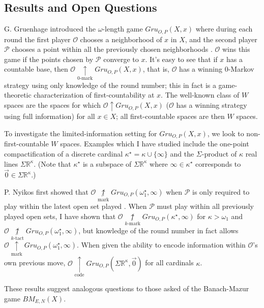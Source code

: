 \documentclass[11pt]{amsart}
\theoremstyle{plain}
\newcommand{\win}{\uparrow}
\newcommand{\markwin}{\underset{\text{mark}}{\uparrow}}
\newcommand{\kmarkwin}[1]{\underset{#1\text{-mark}}{\uparrow}}
\newcommand{\codewin}{\underset{\text{code}}{\uparrow}}
\newcommand{\notmarkwin}{\underset{\text{mark}}{\not\uparrow}}
\newcommand{\notkmarkwin}[1]{\underset{#1\text{-mark}}{\not\uparrow}}
\newcommand{\notktactwin}[1]{\underset{#1\text{-tact}}{\not\uparrow}}
\newcommand{\oneptcomp}[1]{#1^\star}
\newcommand{\gruConGame}[2]{Gru_{O,P}(#1,#2)}
\newcommand{\<}{\langle}
\renewcommand{\>}{\rangle}
\newcommand{\mb}[1]{\mathbb{#1}}
\newcommand{\pl}[1]{\mathscr{#1}}
\newcommand{\bmGame}[1]{{BM}_{E,N}(#1)}
\begin{document}

\subsection*{Results and Open Questions}

G. Gruenhage introduced
the $\omega$-length game $\gruConGame{X}{x}$ where during
each round the first player $\pl O$ chooses a neighborhood of $x$ in $X$, and
the second player $\pl P$ chooses a point within all the previously chosen
neighborhoods \cite{MR0413049}.
$\pl O$ wins this game if the points chosen by $\pl P$
converge to $x$. It's easy to see that if $x$ has a countable base,
then $\pl O \kmarkwin0 \gruConGame{X}{x}$, that is, $\pl O$ has a winning
$0$-Markov strategy using only knowledge of the round number; this in fact is
a game-theoretic characterization of first-countability at $x$. The well-known
class of $W$ spaces are the spaces for which $\pl O \win \gruConGame{X}{x}$
($\pl O$ has a winning strategy using full information)
for all $x\in X$; all first-countable spaces are then $W$ spaces.

To investigate the limited-information setting for $\gruConGame{X}{x}$, we look
to non-first-countable $W$ spaces. Examples which I have studied include the
one-point compactification of a discrete cardinal
$\oneptcomp\kappa=\kappa\cup\{\infty\}$ and the
$\Sigma$-product of $\kappa$ real lines $\Sigma\mb R^\kappa$. (Note that
$\oneptcomp\kappa$ is a subspace of $\Sigma\mb R^\kappa$ where
$\infty\in\oneptcomp\kappa$ corresponds to $\vec0\in\Sigma\mb R^\kappa$.)

P. Nyikos first showed that
$\pl O\notmarkwin\gruConGame{\oneptcomp\omega_1}{\infty}$ when $\pl P$ is only
required to play within the latest open set played \cite{MR1031771}.
When $\pl P$ must play within all previously played open sets, I have shown
that $\pl O\notkmarkwin{k}\gruConGame{\oneptcomp\kappa}{\infty}$ for
$\kappa>\omega_1$ and
$\pl O\notktactwin{k}\gruConGame{\oneptcomp\omega_1}{\infty}$, but knowledge
of the round number in fact allows
$\pl O\markwin\gruConGame{\oneptcomp\omega_1}{\infty}$. When given the ability
to encode information within $\pl O$'s own previous move,
$\pl O\codewin\gruConGame{\Sigma\mb R^\kappa}{\vec0}$ for all cardinals
$\kappa$.

These results suggest analogous questions to those asked of the
Banach-Mazur game $\bmGame{X}$.
\end{document}
